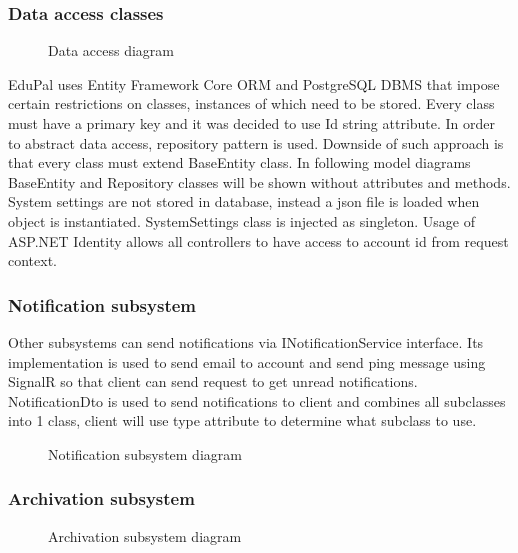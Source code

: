 \documentclass[
    english, %
]{VUMIFPSkursinis}
\begin{document}
\subsubsection{Data access classes}

\begin{figure}[ht]
    \centering
    
    \label{data-access-model}
    \caption{Data access diagram}
\end{figure}

EduPal uses Entity Framework Core ORM and PostgreSQL DBMS that impose certain restrictions on classes, instances of which need to be stored. Every class must have a primary key and it was decided to use Id string attribute. In order to abstract data access, repository pattern is used. Downside of such approach is that every class must extend BaseEntity class. In following model diagrams BaseEntity and Repository classes will be shown without attributes and methods. System settings are not stored in database, instead a json file is loaded when object is instantiated. SystemSettings class is injected as singleton. Usage of ASP.NET Identity allows all controllers to have access to account id from request context.

\subsubsection{Notification subsystem}

Other subsystems can send notifications via INotificationService interface. Its implementation is used to send email to account and send ping message using SignalR so that client can send request to get unread notifications. NotificationDto is used to send notifications to client and combines all subclasses into 1 class, client will use type attribute to determine what subclass to use.

\begin{figure}[ht]
    \centering
    
    \label{notification-model}
    \caption{Notification subsystem diagram}
\end{figure}

\subsubsection{Archivation subsystem}

\begin{figure}[ht]
    \centering
    
    \caption{Archivation subsystem diagram}
    \label{archivation-model}
\end{figure}
\end{document}
